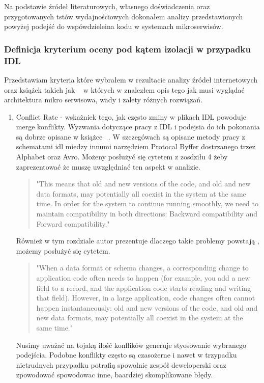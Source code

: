 \documentclass[runningheads,12pt]{llncs}
\begin{document}
Na podstawie źródeł literaturowych, własnego doświadczenia oraz przygotowanych tstów wydajnościowych dokonałem analizy przedstawionych powyżej podejść do wspówdzieleina kodu w systemach mikroserwisów.

\subsubsection{Definicja kryterium oceny pod kątem izolacji w przypadku IDL}

Przedstawiam kryteria które wybrałem w rezultacie analizy źródeł internetowych oraz książek takich jak ~\cite{kleppmann2017designing} w których w znalezłem opis tego jak musi wyglądać architektura mikro serwisowa, wady i zalety różnych rozwiązań.

\begin{enumerate}
    \item Conflict Rate - wskażniek tego, jak często zminy w plikach IDL powoduje merge konflikty. Wyzwania dotyczące pracy z IDL i podejsia do ich pokonania są dobrze opisane w książce ~\cite{kleppmann2017designing}. W szczegówach są opisane metody pracy z schematami idl miedzy innumi narzędziem Protocal Byffer dostrzanego trzez Alphabet oraz Avro. Możeny posłużyć się cytetem z zosdziłu 4 żeby zaprezentować że muszę uwzględniać ten aspekt w analizie.
    \begin{quote}
        "This means that old and new versions of the code, and old and new data formats, may potentially all coexist in the system at the same time. In order for the system to continue running smoothly, we need to maintain compatibility in both directions: Backward compatibility and Forward compatibility." ~\cite[p. 112]{kleppmann2017designing}
    \end{quote}
    Również w tym rozdziale autor prezentuje dlaczego takie problemy powstają , możemy posłużyć się cytetem.
    \begin{quote}
        "When a data format or schema changes, a corresponding change to application code often needs to happen (for example, you add a new field to a record, and the application code starts reading and writing that field). However, in a large application, code changes often cannot happen instantaneously: old and new versions of the code, and old and new data formats, may potentially all coexist in the system at the same time." ~\cite[p. 111]{kleppmann2017designing}
    \end{quote}
    Nusimy uważać na tojaką ilość konflików generuje styosowanie wybranego podejścia. Podobne konflikty często są czasożerne i nawet w trzypadku nietrudnych przypadku potrafią spowolnic zespół deweloperski oraz zpowodować spowodowac inne, baardziej skomplikowane błędy.

\end{enumerate}
\end{document}
